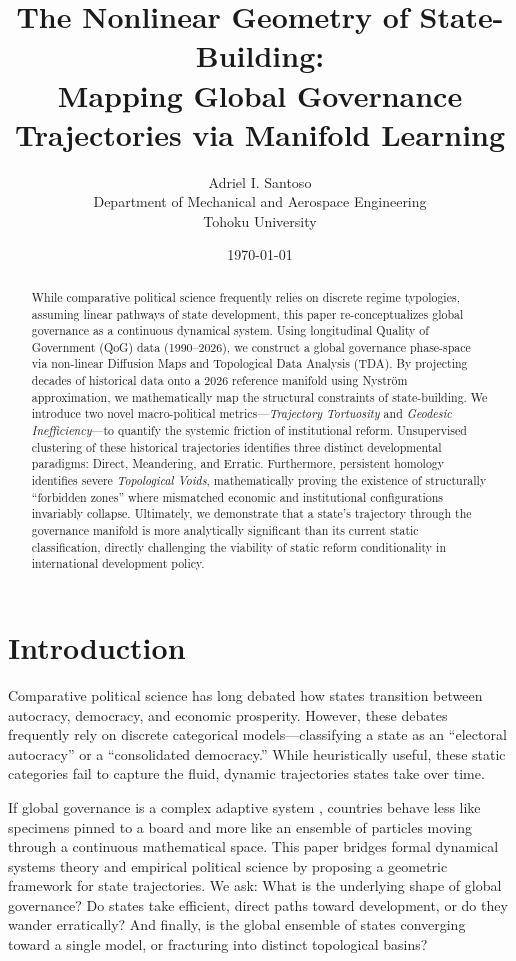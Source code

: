 \documentclass[12pt]{article}
\title{The Nonlinear Geometry of State-Building: \\Mapping Global Governance Trajectories via Manifold Learning}
\author{
Adriel I. Santoso \\
Department of Mechanical and Aerospace Engineering \\
Tohoku University
}
\date{\today}
\begin{document}
\maketitle

\begin{abstract}
    While comparative political science frequently relies on discrete regime typologies, assuming linear pathways of state development, this paper re-conceptualizes global governance as a continuous dynamical system. Using longitudinal Quality of Government (QoG) data (1990--2026), we construct a global governance phase-space via non-linear Diffusion Maps and Topological Data Analysis (TDA). By projecting decades of historical data onto a 2026 reference manifold using Nyström approximation, we mathematically map the structural constraints of state-building. We introduce two novel macro-political metrics---\textit{Trajectory Tortuosity} and \textit{Geodesic Inefficiency}---to quantify the systemic friction of institutional reform. Unsupervised clustering of these historical trajectories identifies three distinct developmental paradigms: Direct, Meandering, and Erratic. Furthermore, persistent homology identifies severe \textit{Topological Voids}, mathematically proving the existence of structurally ``forbidden zones'' where mismatched economic and institutional configurations invariably collapse. Ultimately, we demonstrate that a state's trajectory through the governance manifold is more analytically significant than its current static classification, directly challenging the viability of static reform conditionality in international development policy.
\end{abstract}

\section{Introduction}

Comparative political science has long debated how states transition between autocracy, democracy, and economic prosperity. However, these debates frequently rely on discrete categorical models---classifying a state as an ``electoral autocracy'' or a ``consolidated democracy.'' While heuristically useful, these static categories fail to capture the fluid, dynamic trajectories states take over time.

If global governance is a complex adaptive system \cite{miller2007complex, simon1962architecture}, countries behave less like specimens pinned to a board and more like an ensemble of particles moving through a continuous mathematical space. This paper bridges formal dynamical systems theory and empirical political science by proposing a geometric framework for state trajectories. We ask: What is the underlying shape of global governance? Do states take efficient, direct paths toward development, or do they wander erratically? And finally, is the global ensemble of states converging toward a single model, or fracturing into distinct topological basins?
\end{document}
